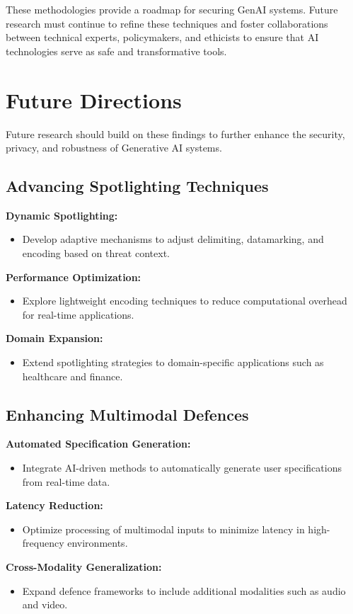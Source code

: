 \documentclass[journal]{IEEEtran}  %
\begin{document}
These methodologies provide a roadmap for securing GenAI systems. Future research must continue to refine these techniques and foster collaborations between technical experts, policymakers, and ethicists to ensure that AI technologies serve as safe and transformative tools.

\section{Future Directions}

Future research should build on these findings to further enhance the security, privacy, and robustness of Generative AI systems.

\subsection{Advancing Spotlighting Techniques}
\textbf{Dynamic Spotlighting:}
\begin{itemize}
    \item Develop adaptive mechanisms to adjust delimiting, datamarking, and encoding based on threat context.
\end{itemize}
\textbf{Performance Optimization:}
\begin{itemize}
    \item Explore lightweight encoding techniques to reduce computational overhead for real-time applications.
\end{itemize}
\textbf{Domain Expansion:}
\begin{itemize}
    \item Extend spotlighting strategies to domain-specific applications such as healthcare and finance.
\end{itemize}

\subsection{Enhancing Multimodal Defences}
\textbf{Automated Specification Generation:}
\begin{itemize}
    \item Integrate AI-driven methods to automatically generate user specifications from real-time data.
\end{itemize}
\textbf{Latency Reduction:}
\begin{itemize}
    \item Optimize processing of multimodal inputs to minimize latency in high-frequency environments.
\end{itemize}
\textbf{Cross-Modality Generalization:}
\begin{itemize}
    \item Expand defence frameworks to include additional modalities such as audio and video.
\end{itemize}
\end{document}
